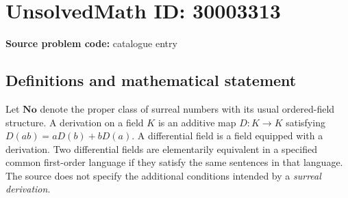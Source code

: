 \documentclass[11pt]{article}
\begin{document}
\section*{UnsolvedMath ID: 30003313}
\textbf{Source problem code:} catalogue entry
\subsection{Definitions and mathematical statement}
Let \(\mathbf{No}\) denote the proper class of surreal numbers with its usual ordered-field structure. A derivation on a field \(K\) is an additive map \(D:K\to K\) satisfying \(D(ab)=aD(b)+bD(a)\). A differential field is a field equipped with a derivation. Two differential fields are elementarily equivalent in a specified common first-order language if they satisfy the same sentences in that language. The source does not specify the additional conditions intended by a \emph{surreal derivation}.
\end{document}
